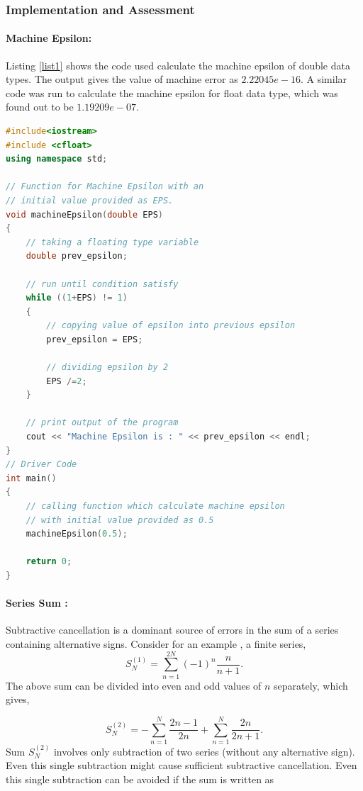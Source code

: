 \documentclass[a4,12pt]{article}
\numberwithin{equation}{subsection}
\begin{document}
\subsubsection{Implementation and Assessment }
\paragraph{Machine Epsilon:}
Listing \ref{list1} shows the code used calculate the machine epsilon of double data types. The output gives the value of machine error as $2.22045e-16$. A similar code was run to calculate the machine epsilon for float data type, which was found out to be $1.19209e-07$.  

\begin{lstlisting}[language=C++, caption= Code to calculate the machine epsilon of double data types., label= list1]
#include<iostream>
#include <cfloat>
using namespace std;

// Function for Machine Epsilon with an
// initial value provided as EPS.
void machineEpsilon(double EPS)
{
    // taking a floating type variable
    double prev_epsilon;

    // run until condition satisfy
    while ((1+EPS) != 1)
    {
        // copying value of epsilon into previous epsilon
        prev_epsilon = EPS;

        // dividing epsilon by 2
        EPS /=2;
    }

    // print output of the program
    cout << "Machine Epsilon is : " << prev_epsilon << endl;
}
// Driver Code
int main()
{
    // calling function which calculate machine epsilon
    // with initial value provided as 0.5
    machineEpsilon(0.5);

    return 0;
}
\end{lstlisting}

\paragraph{Series Sum : } Subtractive cancellation is a dominant source of errors in the sum of a series containing alternative signs. Consider for an example , a finite series,
\begin{equation}
S^{(1)}_N = \sum_{n=1}^{2N} (-1)^n \frac{n}{n+1}.
\end{equation}
The above sum can be divided into even and odd values of $n$ separately, which gives,

\begin{equation}
S^{(2)}_N = - \sum_{n=1}^{N} \frac{2n-1}{2n} + \sum_{n=1}^{N}\frac{2n}{2n+1}.
\end{equation}
Sum $S^{(2)}_N$ involves only subtraction of two series (without any alternative sign). Even this single subtraction might cause sufficient subtractive cancellation. Even this single subtraction can be avoided if the sum is written as 
\end{document}
